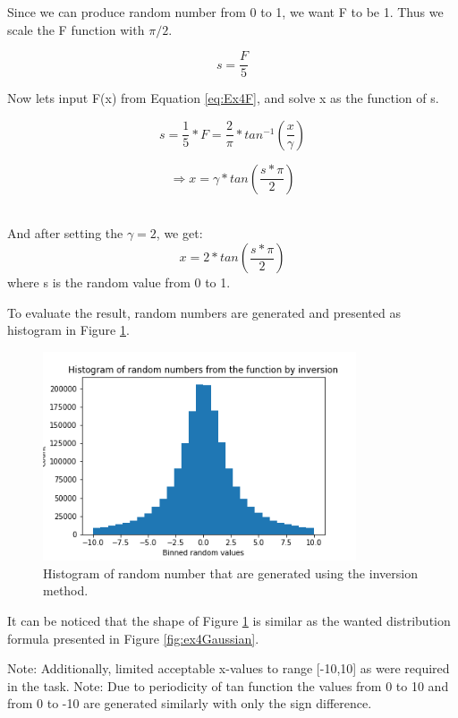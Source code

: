 \documentclass{article}
\begin{document}
Since we can produce random number from 0 to 1, we want F to be 1. Thus we scale the F function with $\pi/2$.

\begin{equation}
	s=\frac{F}{5}
\end{equation}

Now lets input F(x) from Equation \ref{eq:Ex4F}, and solve x as the function of s.

\begin{equation}
s=\frac{1}{5}*F=\frac{2}{\pi}*tan^{-1}\left(\frac{x}{\gamma}\right)
\end{equation}

\begin{equation}
	\Longrightarrow x=\gamma *tan\left( \frac{s*\pi}{2} \right)
\end{equation}\

And after setting the $\gamma =2$, we get:
\begin{equation}
	x=2 *tan\left( \frac{s*\pi}{2} \right)
\end{equation}
where s is the random value from 0 to 1.

To evaluate the result, random numbers are generated and presented as histogram in Figure \ref{fig:ex4histInv}. 
\begin{figure}[!hbt]
	\includegraphics[width=350px]{"../Laskari2/ex4histInv"}
	\caption{Histogram of random number that are generated using the inversion method.}
	\label{fig:ex4histInv}
\end{figure}

It can be noticed that the shape of Figure \ref{fig:ex4histInv} is similar as the wanted distribution formula presented in Figure \ref{fig:ex4Gaussian}.

Note: Additionally, limited acceptable x-values to range [-10,10] as were required in the task. 
Note: Due to periodicity of tan function the values from 0 to 10 and from 0 to -10 are generated similarly with only the sign difference.
\end{document}
